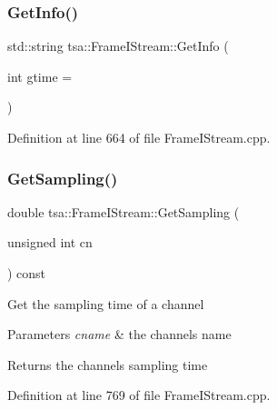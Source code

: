 \mbox{\label{classtsa_1_1_frame_i_stream_a3a199e1e8993581115311de3164550cc}} 
\subsubsection{\texorpdfstring{Get\+Info()}{GetInfo()}}
{\footnotesize\ttfamily std\+::string tsa\+::\+Frame\+I\+Stream\+::\+Get\+Info (\begin{DoxyParamCaption}\item[{int}]{gtime = {} }\end{DoxyParamCaption})}



Definition at line 664 of file Frame\+I\+Stream.\+cpp.

\mbox{\label{classtsa_1_1_frame_i_stream_a02a205a02b70055814056216951476a6}} 
\subsubsection{\texorpdfstring{Get\+Sampling()}{GetSampling()}}
{\footnotesize\ttfamily double tsa\+::\+Frame\+I\+Stream\+::\+Get\+Sampling (\begin{DoxyParamCaption}\item[{unsigned int}]{cn }\end{DoxyParamCaption}) const}

Get the sampling time of a channel


\begin{DoxyParams}{Parameters}
{\em cname} & the channel\textquotesingle{}s name\\
\hline
\end{DoxyParams}
\begin{DoxyReturn}{Returns}
the channel\textquotesingle{}s sampling time 
\end{DoxyReturn}


Definition at line 769 of file Frame\+I\+Stream.\+cpp.

\mbox{\label{classtsa_1_1_frame_i_stream_a88781ac3b80bddcca52e252f416009a6}} 
